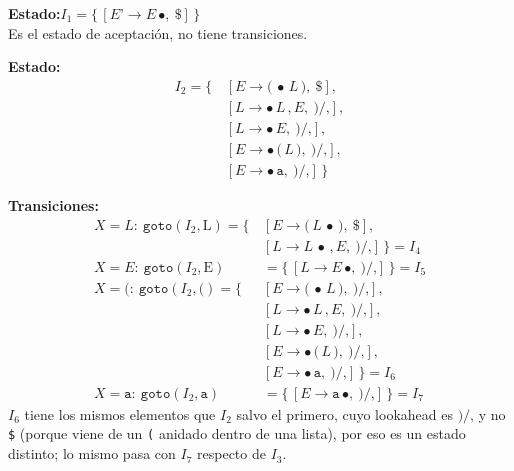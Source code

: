 \documentclass[12pt,letterpaper]{article}
\newcommand{\nt}[1]{\textit{#1}}
\newcommand{\tk}[1]{\texttt{#1}}
\newcommand{\tx}[1]{\text{#1}}
\begin{document}
\begin{enumerate}[label=\arabic*.]
  \textbf{Estado:}\quad $I_1 = \{\,[\nt{E'}\to\nt{E}\,\bullet,\ \tk{\$}]\,\}$\\
  Es el estado de aceptación, no tiene transiciones.

  \bigskip

  \textbf{Estado:}
  \[
  \begin{aligned}
    I_2 = \{\, & [\nt{E}\to\tk{(}\,\bullet\,\nt{L}\,\tk{)},\ \tk{\$}],\\
               & [\nt{L}\to\bullet\,\nt{L}\,\tk{,}\,\nt{E},\ \tk{)}/\tk{,}],\\
               & [\nt{L}\to\bullet\,\nt{E},\ \tk{)}/\tk{,}],\\
               & [\nt{E}\to\bullet\,\tk{(}\,\nt{L}\,\tk{)},\ \tk{)}/\tk{,}],\\
               & [\nt{E}\to\bullet\,\tk{a},\ \tk{)}/\tk{,}]\,\}
    \end{aligned}
  \]
  
  \textbf{Transiciones:}
  \[
  \begin{aligned}
    X=\nt{L}:\ \texttt{goto}(I_2,\tx{L}) = \{\, & [\nt{E}\to\tk{(}\,\nt{L}\,\bullet\,\tk{)},\ \tk{\$}],\\
                                              & [\nt{L}\to\nt{L}\,\bullet\,\tk{,}\,\nt{E},\ \tk{)}/\tk{,}]\,\} = \boxed{I_4}\\[6pt]
    X=\nt{E}:\ \texttt{goto}(I_2,\tx{E}) &= \{\,[\nt{L}\to\nt{E}\,\bullet,\ \tk{)}/\tk{,}]\,\} = \boxed{I_5}\\[6pt]
    X=\tk{(}:\ \texttt{goto}(I_2,\tk{(}) = \{\, & [\nt{E}\to\tk{(}\,\bullet\,\nt{L}\,\tk{)},\ \tk{)}/\tk{,}],\\
                                              & [\nt{L}\to\bullet\,\nt{L}\,\tk{,}\,\nt{E},\ \tk{)}/\tk{,}],\\
                                              & [\nt{L}\to\bullet\,\nt{E},\ \tk{)}/\tk{,}],\\
                                              & [\nt{E}\to\bullet\,\tk{(}\,\nt{L}\,\tk{)},\ \tk{)}/\tk{,}],\\
                                              & [\nt{E}\to\bullet\,\tk{a},\ \tk{)}/\tk{,}]\,\} = \boxed{I_6}\\[6pt]
    X=\tk{a}:\ \texttt{goto}(I_2,\tk{a}) &= \{\,[\nt{E}\to\tk{a}\,\bullet,\ \tk{)}/\tk{,}]\,\} = \boxed{I_7}
  \end{aligned}
  \]
  $I_6$ tiene los mismos elementos que $I_2$ salvo el primero, cuyo lookahead es $\tk{)}/\tk{,}$ y no \tk{\$}
  (porque viene de un \tk{(} anidado dentro de una lista), por eso es un estado distinto; lo mismo pasa con
  $I_7$ respecto de $I_3$.


\end{enumerate}
\end{document}

